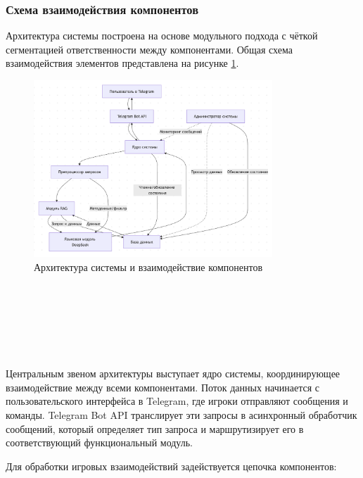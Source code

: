 \subsubsection{Схема взаимодействия компонентов}

Архитектура системы построена на основе модульного подхода с чёткой сегментацией ответственности между компонентами. Общая схема взаимодействия элементов представлена на рисунке \ref{fig:flowchart}.

\begin{figure}[h]
    \centering
    \includegraphics[width=0.8\textwidth]{figures/flowchart}
    \caption{Архитектура системы и взаимодействие компонентов}
    \label{fig:flowchart}
\end{figure}\\
~\\~\\~\\~\\~\\

Центральным звеном архитектуры выступает ядро системы, координирующее взаимодействие между всеми компонентами. Поток данных начинается с пользовательского интерфейса в Telegram, где игроки отправляют сообщения и команды. Telegram Bot API транслирует эти запросы в асинхронный обработчик сообщений, который определяет тип запроса и маршрутизирует его в соответствующий функциональный модуль.

Для обработки игровых взаимодействий задействуется цепочка компонентов:

